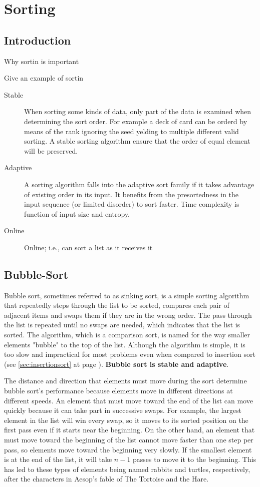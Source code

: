 \chapter{Sorting}

\section{Introduction}
Why sortin is important

Give an example of sortin
\begin{description}
\item[Stable] When sorting some kinds of data, only part of the data is examined when determining the sort order. For example a deck of card can be orderd by means of the rank ignoring the seed yelding to multiple different valid sorting. A stable sorting algorithm ensure that the order of equal element will be preserved. 
\item[Adaptive]	A sorting algorithm falls into the adaptive sort family if it takes advantage of existing order in its input.  It benefits from the presortedness in the input sequence (or limited disorder) to sort faster. Time complexity is function of input size and entropy.
\item [Online] Online; i.e., can sort a list as it receives it
\end{description}

\section{Bubble-Sort}
Bubble sort, sometimes referred to as sinking sort, is a simple sorting algorithm that repeatedly steps through the list to be sorted, compares each pair of adjacent items and swaps them if they are in the wrong order. The pass through the list is repeated until no swaps are needed, which indicates that the list is sorted. The algorithm, which is a comparison sort, is named for the way smaller elements "bubble" to the top of the list. Although the algorithm is simple, it is too slow and impractical for most problems even when compared to insertion sort (see \ref{sec:insertionsort} at page \pageref{sec:insertionsort}). \textbf{Bubble sort is stable and adaptive}.

The distance and direction that elements must move during the sort determine bubble sort's performance because elements move in different directions at different speeds. An element that must move toward the end of the list can move quickly because it can take part in successive swaps. For example, the largest element in the list will win every swap, so it moves to its sorted position on the first pass even if it starts near the beginning. On the other hand, an element that must move toward the beginning of the list cannot move faster than one step per pass, so elements move toward the beginning very slowly. If the smallest element is at the end of the list, it will take $n-1$ passes to move it to the beginning. This has led to these types of elements being named rabbits and turtles, respectively, after the characters in Aesop's fable of The Tortoise and the Hare.

